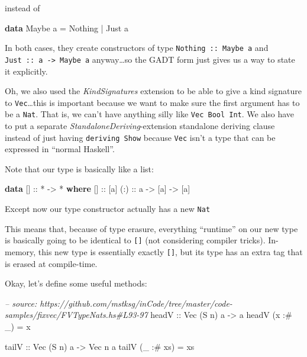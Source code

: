 \documentclass[]{article}
\newenvironment{Shaded}{}{}
\newcommand{\KeywordTok}[1]{\textcolor[rgb]{0.00,0.44,0.13}{\textbf{#1}}}
\newcommand{\DataTypeTok}[1]{\textcolor[rgb]{0.56,0.13,0.00}{#1}}
\newcommand{\CommentTok}[1]{\textcolor[rgb]{0.38,0.63,0.69}{\textit{#1}}}
\newcommand{\OtherTok}[1]{\textcolor[rgb]{0.00,0.44,0.13}{#1}}
\newcommand{\FunctionTok}[1]{\textcolor[rgb]{0.02,0.16,0.49}{#1}}
\newcommand{\NormalTok}[1]{#1}
\begin{document}
instead of

\begin{Shaded}
\begin{Highlighting}[]
\KeywordTok{data} \DataTypeTok{Maybe}\NormalTok{ a }\FunctionTok{=} \DataTypeTok{Nothing} \FunctionTok{|} \DataTypeTok{Just}\NormalTok{ a}
\end{Highlighting}
\end{Shaded}

In both cases, they create constructors of type \texttt{Nothing\ ::\ Maybe\ a}
and \texttt{Just\ ::\ a\ -\textgreater{}\ Maybe\ a} anyway\ldots{}so the GADT
form just gives us a way to state it explicitly.

Oh, we also used the \emph{KindSignatures} extension to be able to give a kind
signature to \texttt{Vec}\ldots{}this is important because we want to make sure
the first argument has to be a \texttt{Nat}. That is, we can't have anything
silly like \texttt{Vec\ Bool\ Int}. We also have to put a separate
\emph{StandaloneDeriving}-extension standalone deriving clause instead of just
having \texttt{deriving\ Show} because \texttt{Vec} isn't a type that can be
expressed in ``normal Haskell''.

Note that our type is basically like a list:

\begin{Shaded}
\begin{Highlighting}[]
\KeywordTok{data}\NormalTok{ []}\OtherTok{ ::} \FunctionTok{*} \OtherTok{->} \FunctionTok{*} \KeywordTok{where}
\NormalTok{    []}\OtherTok{  ::}\NormalTok{ [a]}
\OtherTok{    (:) ::}\NormalTok{ a }\OtherTok{->}\NormalTok{ [a] }\OtherTok{->}\NormalTok{ [a]}
\end{Highlighting}
\end{Shaded}

Except now our type constructor actually has a new \texttt{Nat}

This means that, because of type erasure, everything ``runtime'' on our new type
is basically going to be identical to \texttt{{[}{]}} (not considering compiler
tricks). In-memory, this new type is essentially exactly \texttt{{[}{]}}, but
its type has an extra tag that is erased at compile-time.

Okay, let's define some useful methods:

\begin{Shaded}
\begin{Highlighting}[]
\CommentTok{-- source: https://github.com/mstksg/inCode/tree/master/code-samples/fixvec/FVTypeNats.hs#L93-97}
\OtherTok{headV ::} \DataTypeTok{Vec}\NormalTok{ (}\DataTypeTok{S}\NormalTok{ n) a }\OtherTok{->}\NormalTok{ a}
\NormalTok{headV (x }\FunctionTok{:#}\NormalTok{ _)  }\FunctionTok{=}\NormalTok{ x}

\OtherTok{tailV ::} \DataTypeTok{Vec}\NormalTok{ (}\DataTypeTok{S}\NormalTok{ n) a }\OtherTok{->} \DataTypeTok{Vec}\NormalTok{ n a}
\NormalTok{tailV (_ }\FunctionTok{:#}\NormalTok{ xs) }\FunctionTok{=}\NormalTok{ xs}
\end{Highlighting}
\end{Shaded}
\end{document}
